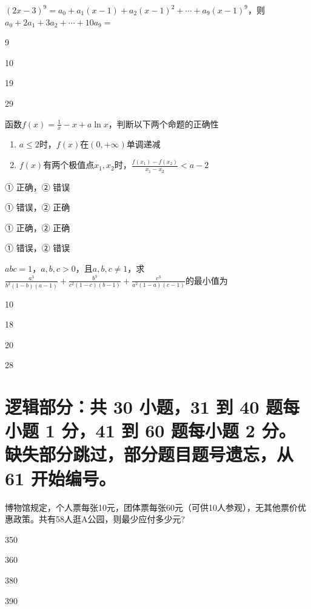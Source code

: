 \documentclass{exam-zh}
\begin{document}
\begin{question}
  $(2x-3)^9=a_0+a_1(x-1)+a_2(x-1)^2+\cdots+a_9(x-1)^9$，则$a_0+2a_1+3a_2+\cdots+10a_9=$ \paren

  \begin{choices}
    \item 9
    \item 10
    \item 19
    \item 29
  \end{choices}
\end{question}

\begin{question}
  函数$f(x)=\frac1x-x+a\ln x$，判断以下两个命题的正确性 \paren

  \begin{enumerate}
    \item $a\le2$时，$f(x)$在$(0,+\infty)$单调递减
    \item $f(x)$有两个极值点$x_1,x_2$时，$\frac{f(x_1)-f(x_2)}{x_1-x_2}<a-2$
  \end{enumerate}
  \begin{choices}
    \item ① 正确，② 错误
    \item ① 错误，② 正确
    \item ① 正确，② 正确
    \item ① 错误，② 错误
  \end{choices}
\end{question}

\begin{question}
  $abc=1$，$a,b,c>0$，且$a,b,c\neq1$，求$\frac{a^3}{b^2(1-b)(a-1)}+\frac{b^3}{c^2(1-c)(b-1)}+\frac{c^3}{a^2(1-a)(c-1)}$的最小值为 \paren

  \begin{choices}
    \item 10
    \item 18
    \item 20
    \item 28
  \end{choices}
\end{question}

\section{%
  逻辑部分：共 30 小题，31 到 40 题每小题 1 分，41 到 60 题每小题 2 分。缺失部分跳过，部分题目题号遗忘，从 61 开始编号。
}

\begin{question}
  博物馆规定，个人票每张10元，团体票每张60元（可供10人参观），无其他票价优惠政策。共有58人逛A公园，则最少应付多少元? \paren

  \begin{choices}
    \item 350
    \item 360
    \item 380
    \item 390
  \end{choices}
\end{question}
\end{document}
